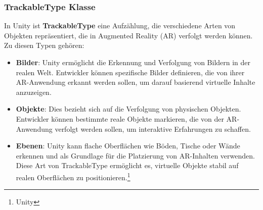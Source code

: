 \subsubsection{\label{sec:TrackableType}TrackableType Klasse}
In Unity ist \textbf{TrackableType} eine Aufzählung, die verschiedene Arten von Objekten repräsentiert, die in Augmented Reality (AR) verfolgt werden können. Zu diesen Typen gehören:

\begin{itemize}
    \item \textbf{Bilder}: Unity ermöglicht die Erkennung und Verfolgung von Bildern in der realen Welt. Entwickler können spezifische Bilder definieren, die von ihrer AR-Anwendung erkannt werden sollen, um darauf basierend virtuelle Inhalte anzuzeigen.

    \item \textbf{Objekte}: Dies bezieht sich auf die Verfolgung von physischen Objekten. Entwickler können bestimmte reale Objekte markieren, die von der AR-Anwendung verfolgt werden sollen, um interaktive Erfahrungen zu schaffen.

    \item \textbf{Ebenen}: Unity kann flache Oberflächen wie Böden, Tische oder Wände erkennen und als Grundlage für die Platzierung von AR-Inhalten verwenden. Diese Art von TrackableType ermöglicht es, virtuelle Objekte stabil auf realen Oberflächen zu positionieren.\protect\footnote{Unity\cite{TrackableType}}
\end{itemize}




